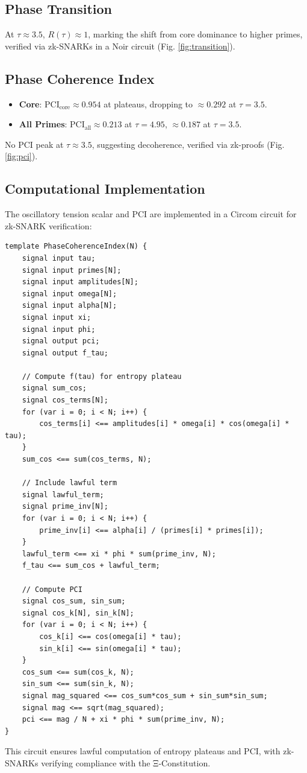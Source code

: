 \documentclass{article}
\theoremstyle{plain}
\begin{document}
\subsection{Phase Transition}
At \( \tau \approx 3.5 \), \( R(\tau) \approx 1 \), marking the shift from core dominance to higher primes, verified via zk-SNARKs in a Noir circuit (Fig. \ref{fig:transition}).

\subsection{Phase Coherence Index}
\begin{itemize}
    \item \textbf{Core}: \( \text{PCI}_{\text{core}} \approx 0.954 \) at plateaus, dropping to \( \approx 0.292 \) at \( \tau = 3.5 \).
    \item \textbf{All Primes}: \( \text{PCI}_{\text{all}} \approx 0.213 \) at \( \tau = 4.95 \), \( \approx 0.187 \) at \( \tau = 3.5 \).
\end{itemize}
No PCI peak at \( \tau \approx 3.5 \), suggesting decoherence, verified via zk-proofs (Fig. \ref{fig:pci}).

\subsection{Computational Implementation}
The oscillatory tension scalar and PCI are implemented in a Circom circuit for zk-SNARK verification:
\begin{verbatim}
template PhaseCoherenceIndex(N) {
    signal input tau;
    signal input primes[N];
    signal input amplitudes[N];
    signal input omega[N];
    signal input alpha[N];
    signal input xi;
    signal input phi;
    signal output pci;
    signal output f_tau;

    // Compute f(tau) for entropy plateau
    signal sum_cos;
    signal cos_terms[N];
    for (var i = 0; i < N; i++) {
        cos_terms[i] <== amplitudes[i] * omega[i] * cos(omega[i] * tau);
    }
    sum_cos <== sum(cos_terms, N);

    // Include lawful term
    signal lawful_term;
    signal prime_inv[N];
    for (var i = 0; i < N; i++) {
        prime_inv[i] <== alpha[i] / (primes[i] * primes[i]);
    }
    lawful_term <== xi * phi * sum(prime_inv, N);
    f_tau <== sum_cos + lawful_term;

    // Compute PCI
    signal cos_sum, sin_sum;
    signal cos_k[N], sin_k[N];
    for (var i = 0; i < N; i++) {
        cos_k[i] <== cos(omega[i] * tau);
        sin_k[i] <== sin(omega[i] * tau);
    }
    cos_sum <== sum(cos_k, N);
    sin_sum <== sum(sin_k, N);
    signal mag_squared <== cos_sum*cos_sum + sin_sum*sin_sum;
    signal mag <== sqrt(mag_squared);
    pci <== mag / N + xi * phi * sum(prime_inv, N);
}
\end{verbatim}
This circuit ensures lawful computation of entropy plateaus and PCI, with zk-SNARKs verifying compliance with the Ξ-Constitution.
\end{document}
